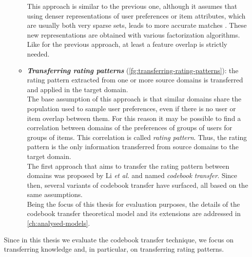 \begin{itemize}
\begin{itemize}
This approach is similar to the previous one, although it assumes that using denser representations of user preferences or item attributes, which are usually both very sparse sets, leads to more accurate matches \cite{10.5555/2283696.2283784, 10.5555/2898607.2898644}. These new representations are obtained with various factorization algorithms. Like for the previous approach, at least a feature overlap is strictly needed.
\item \textbf{\textit{Transferring rating patterns}} (\autoref{fg:transferring-rating-patterns}): the rating pattern extracted from one or more source domains is transferred and applied in the target domain.\\
The base assumption of this approach is that similar domains share the population used to sample user preferences, even if there is no user or item overlap between them. For this reason it may be possible to find a correlation between domains of the preferences of groups of users for groups of items. This correlation is called \textit{rating pattern}. Thus, the rating pattern is the only information transferred from source domains to the target domain.\\
The first approach that aims to transfer the rating pattern between domains was proposed by Li \textit{et al.} \cite{10.5555/1661445.1661773} and named \textit{codebook transfer}. Since then, several variants of codebook transfer have surfaced, all based on the same assumptions.\\
Being the focus of this thesis for evaluation purposes, the details of the codebook transfer theoretical model and its extensions are addressed in \autoref{ch:analysed-models}.
\end{itemize}
\end{itemize}
Since in this thesis we evaluate the codebook transfer technique, we focus on transferring knowledge and, in particular, on transferring rating patterns.

